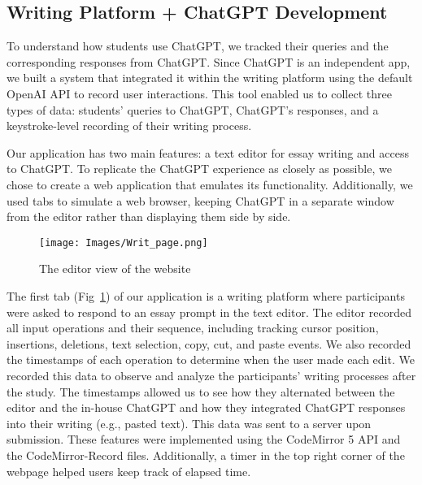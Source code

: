\documentclass[manuscript,screen,acmsmall]{acmart}
\begin{document}
\subsection{Writing Platform + ChatGPT Development}
To understand how students use ChatGPT, we tracked their queries and the corresponding responses from ChatGPT. Since ChatGPT is an independent app, we built a system that integrated it within the writing platform using the default OpenAI API to record user interactions. This tool enabled us to collect three types of data: students' queries to ChatGPT, ChatGPT's responses, and a keystroke-level recording of their writing process.


Our application has two main features: a text editor for essay writing and access to ChatGPT. To replicate the ChatGPT experience as closely as possible, we chose to create a web application that emulates its functionality. Additionally, we used tabs to simulate a web browser, keeping ChatGPT in a separate window from the editor rather than displaying them side by side.

\begin{figure}[h!]
    \centering
    \texttt{[image: Images/Writ\_page.png]}
    \caption{The editor view of the website}
    \label{fig:writ_page}
\end{figure}

The first tab (Fig~\ref{fig:writ_page})  of our application is a writing platform where participants were asked to respond to an essay prompt in the text editor. 
The editor recorded all input operations and their sequence, including tracking cursor position, insertions, deletions, text selection, copy,  cut, and paste events. We also recorded the timestamps of each operation to determine when the user made each edit.
We recorded this data to observe and analyze the participants' writing processes after the study. The timestamps allowed us to see how they alternated between the editor and the in-house ChatGPT and how they integrated ChatGPT responses into their writing (e.g., pasted text). This data was sent to a server upon submission. These features were implemented using the CodeMirror 5 API and the CodeMirror-Record files. Additionally, a timer in the top right corner of the webpage helped users keep track of elapsed time.
\end{document}

